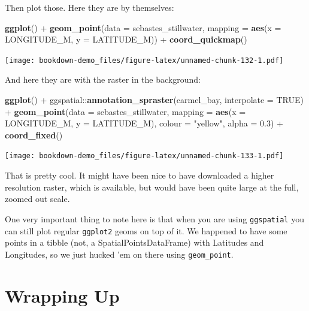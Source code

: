 \documentclass[]{book}
\newenvironment{Shaded}{\begin{snugshade}}{\end{snugshade}}
\newcommand{\KeywordTok}[1]{\textcolor[rgb]{0.13,0.29,0.53}{\textbf{{#1}}}}
\newcommand{\DataTypeTok}[1]{\textcolor[rgb]{0.13,0.29,0.53}{{#1}}}
\newcommand{\FloatTok}[1]{\textcolor[rgb]{0.00,0.00,0.81}{{#1}}}
\newcommand{\StringTok}[1]{\textcolor[rgb]{0.31,0.60,0.02}{{#1}}}
\newcommand{\OtherTok}[1]{\textcolor[rgb]{0.56,0.35,0.01}{{#1}}}
\newcommand{\NormalTok}[1]{{#1}}
\theoremstyle{definition}
\theoremstyle{definition}
\theoremstyle{remark}
\begin{document}
Then plot those. Here they are by themselves:

\begin{Shaded}
\begin{Highlighting}[]
\KeywordTok{ggplot}\NormalTok{() +}
\StringTok{  }\KeywordTok{geom_point}\NormalTok{(}\DataTypeTok{data =} \NormalTok{sebastes_stillwater, }\DataTypeTok{mapping =} \KeywordTok{aes}\NormalTok{(}\DataTypeTok{x =} \NormalTok{LONGITUDE_M, }\DataTypeTok{y =} \NormalTok{LATITUDE_M)) +}
\StringTok{  }\KeywordTok{coord_quickmap}\NormalTok{()}
\end{Highlighting}
\end{Shaded}

\texttt{[image: bookdown-demo\_files/figure-latex/unnamed-chunk-132-1.pdf]}

And here they are with the raster in the background:

\begin{Shaded}
\begin{Highlighting}[]
\KeywordTok{ggplot}\NormalTok{() +}
\StringTok{  }\NormalTok{ggspatial::}\KeywordTok{annotation_spraster}\NormalTok{(carmel_bay, }\DataTypeTok{interpolate =} \OtherTok{TRUE}\NormalTok{) +}
\StringTok{  }\KeywordTok{geom_point}\NormalTok{(}\DataTypeTok{data =} \NormalTok{sebastes_stillwater, }\DataTypeTok{mapping =} \KeywordTok{aes}\NormalTok{(}\DataTypeTok{x =} \NormalTok{LONGITUDE_M, }\DataTypeTok{y =} \NormalTok{LATITUDE_M), }
             \DataTypeTok{colour =} \StringTok{"yellow"}\NormalTok{,}
             \DataTypeTok{alpha =} \FloatTok{0.3}\NormalTok{) +}
\StringTok{  }\KeywordTok{coord_fixed}\NormalTok{()}
\end{Highlighting}
\end{Shaded}

\texttt{[image: bookdown-demo\_files/figure-latex/unnamed-chunk-133-1.pdf]}

That is pretty cool. It might have been nice to have downloaded a higher
resolution raster, which is available, but would have been quite large
at the full, zoomed out scale.

One very important thing to note here is that when you are using
\texttt{ggspatial} you can still plot regular \texttt{ggplot2} geoms on
top of it. We happened to have some points in a tibble (not, a
SpatialPointsDataFrame) with Latitudes and Longitudes, so we just hucked
'em on there using \texttt{geom\_point}.

\section{Wrapping Up}\label{wrapping-up}
\end{document}
